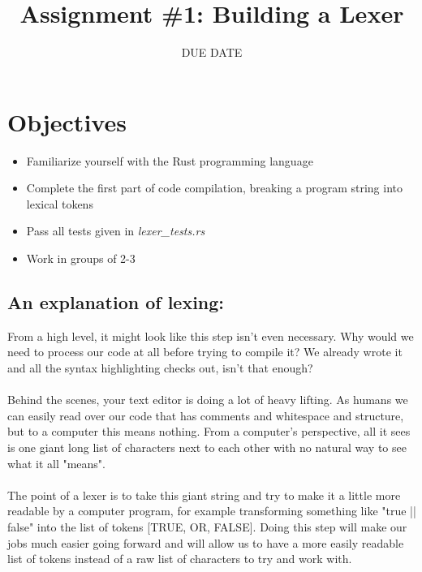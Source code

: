 \documentclass[
	12pt, %
]{fphw}
\title{Assignment \#1: Building a Lexer} %
\date{DUE DATE} %
\institute{Union College} %
\begin{document}
\maketitle %


\section*{Objectives}

\begin{problem}
	\begin{itemize}
	    \item Familiarize yourself with the Rust programming language
        \item Complete the first part of code compilation, breaking a program string into lexical tokens
        \item Pass all tests given in \textit{lexer\_tests.rs}
        \item Work in groups of 2-3
        
	\end{itemize}
\end{problem}


\subsection*{An explanation of lexing:}
From a high level, it might look like this step isn't even necessary. Why would we need to process our code at all before trying to compile it? We already wrote it and all the syntax highlighting checks out, isn't that enough? \\
\\
Behind the scenes, your text editor is doing a lot of heavy lifting. As humans we can easily read over our code that has comments and whitespace and structure, but to a computer this means nothing. From a computer's perspective, all it sees is one giant long list of characters next to each other with no natural way to see what it all "means".\\
\\
The point of a lexer is to take this giant string and try to make it a little more readable by a computer program, for example transforming something like "true || false" into the list of tokens [TRUE, OR, FALSE]. Doing this step will make our jobs much easier going forward and will allow us to have a more easily readable list of tokens instead of a raw list of characters to try and work with.
\end{document}
